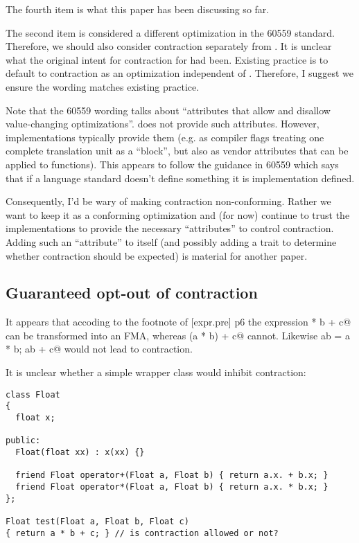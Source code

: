 The fourth item is what this paper has been discussing so far.

The second item is considered a different optimization in the 60559 standard.
Therefore, we should also consider \fp contraction separately from
.
It is unclear what the original intent for \fp contraction for \CC{} had been.
Existing practice is to default to \fp contraction as an optimization
independent of .
Therefore, I suggest we ensure the wording matches existing practice.

Note that the 60559 wording talks about “attributes that allow and disallow
value-changing optimizations”.
\CC{} does not provide such attributes.
However, implementations typically provide them (e.g. as compiler flags
treating one complete translation unit as a “block”, but also as vendor
attributes that can be applied to functions).
This appears to follow the guidance in 60559 which says that if a language
standard doesn't define something it is implementation defined.

Consequently, I'd be wary of making \fp contraction non-conforming.
Rather we want to keep it as a conforming optimization and (for now) continue
to trust the implementations to provide the necessary “attributes” to control
\fp contraction.
Adding such an “attribute” to \CC{} itself (and possibly adding a trait to
determine whether \fp contraction should be expected) is material for another
paper.

\subsection{Guaranteed opt-out of \fp contraction}

It appears that accoding to the footnote of [expr.pre] p6 the expression
\lstinline@a * b + c@ can be transformed into an FMA, whereas
\lstinline@auto(a * b) + c@ cannot.
Likewise \lstinline@auto ab = a * b; ab + c@ would not lead to \fp contraction.

It is unclear whether a simple \fp wrapper class would inhibit \fp contraction:
\medskip
\begin{lstlisting}
class Float
{
  float x;

public:
  Float(float xx) : x(xx) {}

  friend Float operator+(Float a, Float b) { return a.x. + b.x; }
  friend Float operator*(Float a, Float b) { return a.x. * b.x; }
};

Float test(Float a, Float b, Float c)
{ return a * b + c; } // is contraction allowed or not?
\end{lstlisting}

